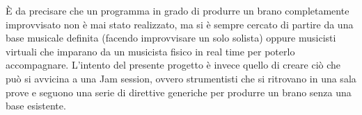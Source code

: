 È da precisare che un programma in grado di produrre un brano completamente improvvisato non è mai stato realizzato, ma si è sempre cercato di partire da una base musicale definita (facendo improvvisare un solo solista) oppure musicisti virtuali che imparano da un musicista fisico in real time per poterlo accompagnare.
L'intento del presente progetto è invece quello di creare ciò che può si avvicina a una Jam session, ovvero strumentisti che si ritrovano in una sala prove e seguono una serie di direttive generiche per produrre un brano senza una base esistente.
